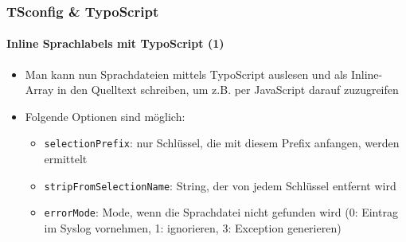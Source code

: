 \begin{frame}[fragile]
	\frametitle{TSconfig \& TypoScript}
	\framesubtitle{Inline Sprachlabels mit TypoScript (1)}

	\lstset{basicstyle=\tiny\ttfamily}

	\begin{itemize}

		\item Man kann nun Sprachdateien mittels TypoScript auslesen und als Inline-Array
			in den Quelltext schreiben, um z.B. per JavaScript darauf zuzugreifen

		\item Folgende Optionen sind möglich:

			\begin{itemize}
				\item \texttt{selectionPrefix}:\newline
					nur Schlüssel, die mit diesem Prefix anfangen, werden ermittelt
				\item \texttt{stripFromSelectionName}:\newline
					String, der von jedem Schlüssel entfernt wird
				\item \texttt{errorMode}:\newline
					Mode, wenn die Sprachdatei nicht gefunden wird\newline
					(0: Eintrag im Syslog vornehmen, 1: ignorieren, 3: Exception generieren)
			\end{itemize}

	\end{itemize}

\end{frame}

